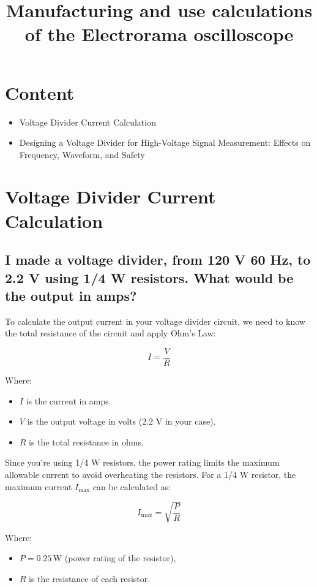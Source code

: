 \documentclass{article}
\title{Manufacturing and use calculations of the Electrorama oscilloscope}
\author{}
\date{}
\begin{document}
	
	\maketitle
	
	\section*{Content}
	\begin{itemize}
		\item Voltage Divider Current Calculation
		\item Designing a Voltage Divider for High-Voltage Signal Measurement: Effects on Frequency, Waveform, and Safety
	\end{itemize}
	
	\section{Voltage Divider Current Calculation}
	
	\subsection*{I made a voltage divider, from 120 V 60 Hz, to 2.2 V using 1/4 W resistors. What would be the output in \textbf{amps}?}

	To calculate the output current in your voltage divider circuit, we need to know the total resistance of the circuit and apply Ohm's Law:
	
	\[
	I = \frac{V}{R}
	\]
	
	Where:
	\begin{itemize}
		\item \( I \) is the current in amps.
		\item \( V \) is the output voltage in volts (2.2 V in your case).
		\item \( R \) is the total resistance in ohms.
	\end{itemize}
	
	Since you're using 1/4 W resistors, the power rating limits the maximum allowable current to avoid overheating the resistors. For a 1/4 W resistor, the maximum current \( I_{\text{max}} \) can be calculated as:
	
	\[
	I_{\text{max}} = \sqrt{\frac{P}{R}}
	\]
	
	Where:
	\begin{itemize}
		\item \( P = 0.25 \, \text{W} \) (power rating of the resistor),
		\item \( R \) is the resistance of each resistor.
	\end{itemize}
	
\end{document}
